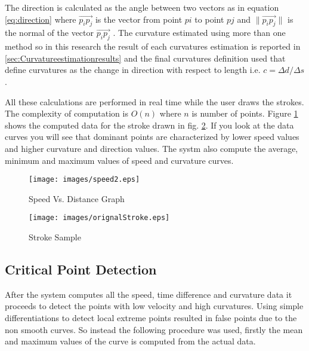   The direction is calculated as the angle between two vectors as in equation \ref{eq:direction} where $\overrightarrow {p_i p_j }$ is the vector from point $pi$ to point $pj$ and $\|{\overrightarrow {p_i p_j }}\|$ is the normal of the  vector $\overrightarrow{p_i p_j }$  . The curvature estimated using more than one method so in this research the result of each curvatures estimation is reported in \ref{sec:Curvatureestimationresults} and the final curvatures definition used that define curvatures as the change in direction with respect to length i.e. $c= \Delta d/\Delta s$.
 
 All these calculations are performed in real time while the user draws the strokes. The complexity of computation is $O(n)$ where $n$ is number of points. Figure \ref{fig:speed2Distance} shows the computed data for the stroke drawn in fig. \ref{fig:orignalStroke}. If you look at the data curves you will see that dominant points are characterized by lower speed values and higher curvature and direction values. The systm also compute the average, minimum and maximum values of speed and curvature curves.  \\%

\begin{figure}
	\centering
		\texttt{[image: images/speed2.eps]}
	\caption{Speed Vs. Distance Graph}
	\label{fig:speed2Distance}
\end{figure}


\begin{figure}[]
	\centering
		\texttt{[image: images/orignalStroke.eps]}
	\caption{Stroke Sample}
	\label{fig:orignalStroke}
\end{figure}




\subsection{Critical Point Detection}
\label{sec:CriticalPointDetection}
After the system computes all the speed, time difference and curvature data it proceeds to detect the points with low velocity and high curvatures. Using simple differentiations to detect local extreme points resulted in false points due to the non smooth curves. So instead the following procedure was used, firstly the mean and maximum values of the curve is computed from the actual data. 

